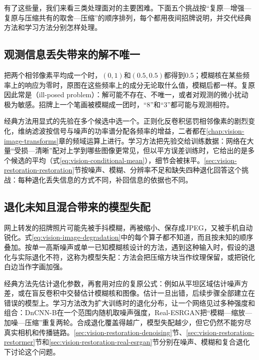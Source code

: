 有了这些量，我们来看三类处理面对的主要困难。下面五个挑战按“复原—增强—复原与压缩共有的取舍—压缩”的顺序排列，每个都用夜间招牌说明，并交代经典方法和学习方法分别怎样处理。

\subsection{观测信息丢失带来的解不唯一}
\label{sec:vision-restoration-challenge-illposed}

把两个相邻像素平均成一个时，$(0,1)$和$(0.5,0.5)$都得到0.5；模糊核在某些频率上的响应为零时，原图在这些频率上的成分无论取什么值，模糊后都一样。复原因此常是（ill-posed problem）：解可能不存在、不唯一，或者对观测的微小扰动极为敏感。招牌上一个笔画被模糊成一团时，“8”和“3”都可能与观测相符。

经典方法用显式的先验在多个候选中选一个。正则化反卷积惩罚相邻像素的剧烈变化，维纳滤波按信号与噪声的功率谱分配各频率的增益，二者都在\ref{chap:vision-image-transforms}章的频域运算上进行。学习方法把先验交给训练数据：网络在大量“受损—清晰”配对上学到哪些图像更常见，但以平方误差训练时，它给出的是多个候选的平均（式\eqref{eq:vision-conditional-mean}），细节会被抹平。\ref{sec:vision-restoration-restoration}节按噪声、模糊、分辨率不足和缺失四种退化回答这个挑战：每种退化丢失信息的方式不同，补回信息的依据也不同。

\subsection{退化未知且混合带来的模型失配}
\label{sec:vision-restoration-challenge-mismatch}

网上转发的招牌照片可能先被手抖模糊，再被缩小、保存成JPEG，又被手机自动锐化。式\eqref{eq:vision-image-degradation}中的每个算子都不知道，而且按未知的顺序叠加。按单一高斯噪声或单一已知模糊核设计的方法，遇到这种输入时，假设的退化与实际退化不符，这称为模型失配：方法会把压缩方块当作纹理保留，或把锐化白边当作字画加强。

经典方法先估计退化参数，再套用对应的复原公式：例如从平坦区域估计噪声方差，或在盲反卷积中交替估计模糊核和图像。估计一旦出错，后续步骤全部建立在错误的模型上。学习方法改为扩大训练时的退化分布，让一个网络见过多种强度和组合：DnCNN-B在一个范围内随机取噪声强度，Real-ESRGAN把“模糊—缩放—加噪—压缩”重复两轮。合成退化覆盖得越广，模型失配越少，但它仍然不能穷尽真实相机和传播链路。\ref{sec:vision-restoration-denoising}节、\ref{sec:vision-restoration-restormer}节和\ref{sec:vision-restoration-real-esrgan}节分别在噪声、模糊和复合退化下讨论这个问题。

